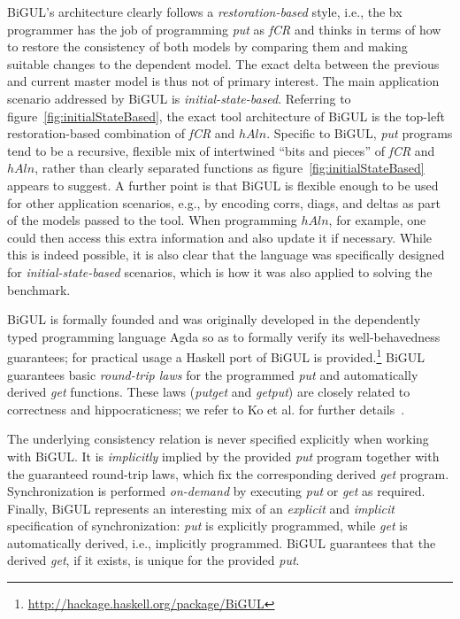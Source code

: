 BiGUL's architecture clearly follows a \emph{restoration-based} style, i.e., the bx programmer has the job of programming \emph{put} as \emph{fCR}
and thinks in terms of how to restore the consistency of both models by comparing them and making suitable changes to the dependent model.
The exact delta between the previous and current master model is thus not of primary interest.
The main application scenario addressed by BiGUL is \emph{initial-state-based}.
Referring to figure~\ref{fig:initialStateBased}, the exact tool architecture of BiGUL is the top-left restoration-based combination of \emph{fCR} and $hAln$.
Specific to BiGUL, \emph{put} programs tend to be a recursive, flexible mix of intertwined ``bits and pieces'' of \emph{fCR} and $hAln$, rather than clearly separated functions as figure~\ref{fig:initialStateBased} appears to suggest.
A further point is that BiGUL is flexible enough to be used for other application scenarios, e.g., by encoding corrs, diags, and deltas as part of the models passed to the tool.
When programming $hAln$, for example, one could then access this extra information and also update it if necessary.
While this is indeed possible, it is also clear that the language was specifically designed for \emph{initial-state-based} scenarios, which is how it was also applied to solving the benchmark.

BiGUL is formally founded and was originally developed in the dependently typed programming language Agda so as to formally verify its well-behavedness guarantees; for practical usage a Haskell port of BiGUL is provided.\footnote{\url{http://hackage.haskell.org/package/BiGUL}}
BiGUL guarantees basic \emph{round-trip laws} for the programmed \emph{put} and automatically derived \emph{get} functions.
These laws (\emph{putget} and \emph{getput}) are closely related to correctness and hippocraticness; we refer to Ko et al. for further details~\cite{PEPM2016-Ko}.

The underlying consistency relation is never specified explicitly when working with BiGUL.
It is \emph{implicitly} implied by the provided \emph{put} program together with the guaranteed round-trip laws, which fix the corresponding derived \emph{get} program.
Synchronization is performed \emph{on-demand} by executing \emph{put} or \emph{get} as required.
Finally, BiGUL represents an interesting mix of an \emph{explicit} and \emph{implicit} specification of synchronization:  \emph{put} is explicitly programmed, while \emph{get} is automatically derived, i.e., implicitly programmed.
BiGUL guarantees that the derived \emph{get}, if it exists, is unique for the provided \emph{put}.

